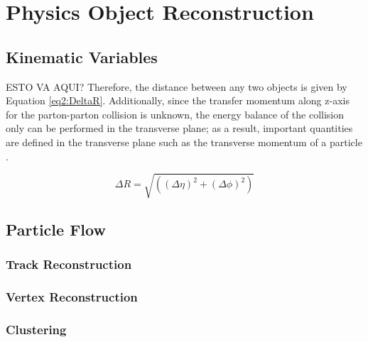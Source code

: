 \chapter[Physics Object Reconstruction]{Physics Object Reconstruction}
\label{chap:ParticleID}


\section{Kinematic Variables}
\label{sec:KinamaticVariable}

ESTO VA AQUI?
Therefore, the distance between any two objects is given by Equation \ref{eq2:DeltaR}. Additionally, 
since the transfer momentum along z-axis for the parton-parton collision is unknown, the energy
balance of the collision only can be performed in the transverse plane; as a result, 
important quantities are defined in the transverse plane such as the transverse momentum
of a particle \pt. 

\begin{equation} \label{eq2:DeltaR}
 \Delta R = \sqrt{\left( (\Delta \eta)^{2}+ (\Delta \phi)^{2} \right) }
\end{equation} 

\section{Particle Flow}
\label{sec:PF}

\subsection{Track Reconstruction}
\label{subsec:TrackReco}

\subsection{Vertex Reconstruction}
\label{subsec:VertexReco}

\subsection{Clustering}
\label{subsec:Clustering}

